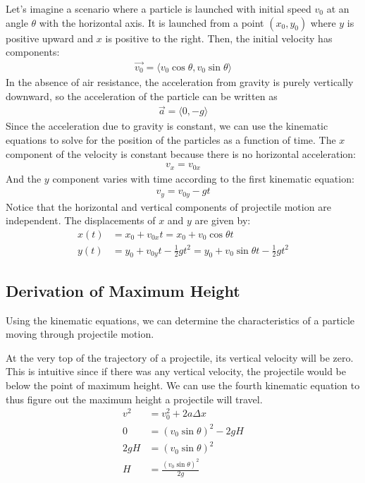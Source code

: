 \documentclass[11pt]{report}
\begin{document}
Let's imagine a scenario where a particle is launched with initial speed $v_{0}$ at an angle $\theta$ with the horizontal axis. It is launched from a point $(x_{0}, y_{0})$ where $y$ is positive upward and $x$ is positive to the right. Then, the initial velocity has components:
\begin{align*}
    \Vec{v_{0}} = \langle v_{0}\cos{\theta}, v_{0}\sin{\theta} \rangle
\end{align*}
In the absence of air resistance, the acceleration from gravity is purely vertically downward, so the acceleration of the particle can be written as
\begin{align*}
    \Vec{a} = \langle 0, -g \rangle
\end{align*}
Since the acceleration due to gravity is constant, we can use the kinematic equations to solve for the position of the particles as a function of time. The $x$ component of the velocity is constant because there is no horizontal acceleration:
\begin{align*}
    v_{x} = v_{0x}
\end{align*}
And the $y$ component varies with time according to the first kinematic equation:
\begin{align*}
    v_{y} = v_{0y} - gt
\end{align*}
Notice that the horizontal and vertical components of projectile motion are independent. The displacements of $x$ and $y$ are given by:
\begin{align*}
    x(t) &= x_{0} + v_{0x}t = x_{0} + v_{0}\cos{\theta}t\\
    y(t) &= y_{0} + v_{0y}t - \frac{1}{2}gt^{2} = y_{0} + v_{0}\sin{\theta}t - \frac{1}{2}gt^{2}
\end{align*}


\subsection{Derivation of Maximum Height}

Using the kinematic equations, we can determine the characteristics of a particle moving through projectile motion. 

At the very top of the trajectory of a projectile, its vertical velocity will be zero. This is intuitive since if there was any vertical velocity, the projectile would be below the point of maximum height. We can use the fourth kinematic equation to thus figure out the maximum height a projectile will travel.
\begin{align*}
    v^{2} &= v_0^{2} + 2a\Delta x \\
    0 &= (v_{0}\sin{\theta})^2 - 2gH \\
    2gH &= (v_{0}\sin{\theta})^2 \\
    H &= \frac{(v_{0}\sin{\theta})^2}{2g}
\end{align*}
\end{document}
